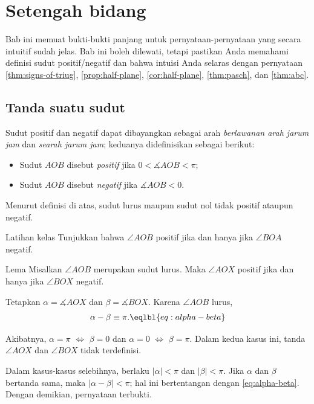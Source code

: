 \chapter{Setengah bidang}\label{chap:half-planes}

Bab ini memuat bukti-bukti panjang untuk pernyataan-pernyataan yang secara intuitif sudah jelas.
Bab ini boleh dilewati, tetapi pastikan Anda memahami definisi sudut positif/negatif dan bahwa intuisi Anda selaras dengan pernyataan \ref{thm:signs-of-triug}, \ref{prop:half-plane}, \ref{cor:half-plane}, \ref{thm:pasch}, dan \ref{thm:abc}.

\section{Tanda suatu sudut}

Sudut positif dan negatif dapat dibayangkan sebagai arah {}\emph{berlawanan arah jarum jam} dan {}\emph{searah jarum jam}; keduanya didefinisikan sebagai berikut:
\begin{itemize}
\item Sudut $A O B$ disebut \emph{positif} 
jika $0<\measuredangle A O B<\pi$;
\item Sudut $A O B$ disebut {}\emph{negatif} 
jika $\measuredangle A O B<0$.
\end{itemize}

Menurut definisi di atas, sudut lurus maupun sudut nol
tidak positif ataupun negatif.

\begin{thm}{Latihan kelas}\label{ex:AOB+<=>BOA-}
Tunjukkan bahwa $\angle A O B$ positif jika dan hanya jika $\angle B O A$ negatif.
\end{thm}

\begin{thm}{Lema}\label{lem:straight-sign}
Misalkan $\angle AOB$ merupakan sudut lurus.
Maka $\angle AOX$ positif 
jika dan hanya jika $\angle BOX$ negatif.
\end{thm}

Tetapkan $\alpha=\measuredangle AOX$ 
dan 
$\beta=\measuredangle BOX$.
Karena $\angle AOB$ lurus,
$$\alpha-\beta\equiv \pi.\eqlbl{eq:alpha-beta}$$

Akibatnya, $\alpha=\pi$ $\Leftrightarrow$ $\beta=0$
dan $\alpha=0$ $\Leftrightarrow$ $\beta=\pi$.
Dalam kedua kasus ini, tanda $\angle AOX$ dan $\angle BOX$ tidak terdefinisi.

Dalam kasus-kasus selebihnya, berlaku $|\alpha|<\pi$ dan $|\beta|<\pi$.
Jika $\alpha$ dan $\beta$ bertanda sama, maka $|\alpha-\beta|<\pi$;
hal ini bertentangan dengan \ref{eq:alpha-beta}.
Dengan demikian, pernyataan terbukti.
\qeds

